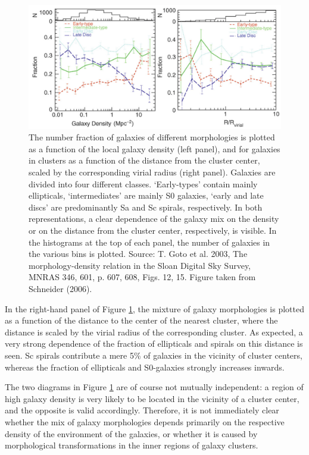 \documentclass[a4paper,10pt]{article}
\begin{document}
\begin{figure}[t!]
    \includegraphics[width=16cm]{figures/DensityMorphology.png}
    \centering
    \caption{\footnotesize{The number fraction of galaxies of different morphologies is plotted as a function of the local galaxy density (left panel), and for galaxies in clusters as a function of the distance from the cluster center, scaled by the corresponding virial radius (right panel). Galaxies are divided into four different classes. `Early-types' contain mainly ellipticals, `intermediates' are mainly S0 galaxies, `early and late discs' are predominantly Sa and Sc spirals, respectively. In both representations, a clear dependence of the galaxy mix on the density or on the distance from the cluster center, respectively, is visible. In the histograms at the top of each panel, the number of galaxies in the various bins is plotted. Source: T. Goto et al. 2003, The morphology-density relation in the Sloan Digital Sky Survey, MNRAS 346, 601, p. 607, 608, Figs. 12, 15. Figure taken from Schneider (2006).}}
    \label{fig:densitymorphology}
\end{figure}

{\noindent}In the right-hand panel of Figure \ref{fig:densitymorphology}, the mixture of galaxy morphologies is plotted as a function of the distance to the center of the nearest cluster, where the distance is scaled by the virial radius of the corresponding cluster. As expected, a very strong dependence of the fraction of ellipticals and spirals on this distance is seen. Sc spirals contribute a mere 5\% of galaxies in the vicinity of cluster centers, whereas the fraction of ellipticals and S0-galaxies strongly increases inwards.

{\noindent}The two diagrams in Figure \ref{fig:densitymorphology} are of course not mutually independent: a region of high galaxy density is very likely to be located in the vicinity of a cluster center, and the opposite is valid accordingly. Therefore, it is not immediately clear whether the mix of galaxy morphologies depends primarily on the respective density of the environment of the galaxies, or whether it is caused by morphological transformations in the inner regions of galaxy clusters.
\end{document}
